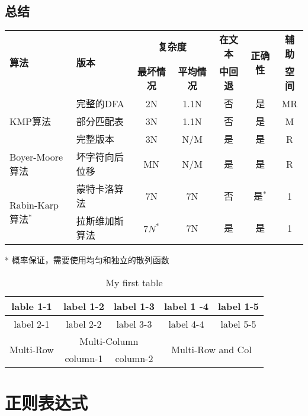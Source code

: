 \subsection{总结}
\vspace{1ex}
\begin{center}
\begin{tabular}{llccccc}
\hline
\multirow{2}{*}{\textbf{算法}} & \multirow{2}{*}{\textbf{版本}} & \multicolumn{2}{c}{\textbf{复杂度}} & \textbf{在文本} & \multirow{2}{*}{\textbf{正确性}} & \textbf{辅助}\\
\cline{3-4} & & \textbf{最坏情况} & \textbf{平均情况} & \textbf{中回退} & & \textbf{空间}\\
\hline
\multirow{3}{*}{KMP算法} & 完整的DFA & 2N & 1.1N & 否 & 是 & MR\\
                         & 部分匹配表 & 3N & 1.1N & 否 & 是 & M\\
						 & 完整版本 & 3N & N/M & 是 & 是 & R\\
\hline
Boyer-Moore算法 & 坏字符向后位移 & MN & N/M & 是 & 是 & R\\
\hline
\multirow{2}{*}{Rabin-Karp算法$^*$} & 蒙特卡洛算法 & 7N & 7N & 否 & 是$^*$ & 1\\
                         & 拉斯维加斯算法 & $7N^*$ & 7N & 是 & 是 & 1\\
\hline
\end{tabular}
\end{center}
\small{* 概率保证，需要使用均匀和独立的散列函数}

\begin{table}[!hbp]
\begin{tabular}{|c|c|c|c|c|}
\hline
\hline
lable 1-1 & label 1-2 & label 1-3 & label 1 -4 & label 1-5 \\
\hline
label 2-1 & label 2-2 & label 3-3 & label 4-4 & label 5-5 \\
\hline
\multirow{2}{*}{Multi-Row} & \multicolumn{2}{|c|}{Multi-Column} & \multicolumn{2}{|c|}{\multirow{2}{*}{Multi-Row and Col}} \\
\cline{2-3}
& column-1 & column-2 & \multicolumn{2}{|c|}{}\\
\hline
\end{tabular}
\caption{My first table}
\end{table}

\section{正则表达式} %
